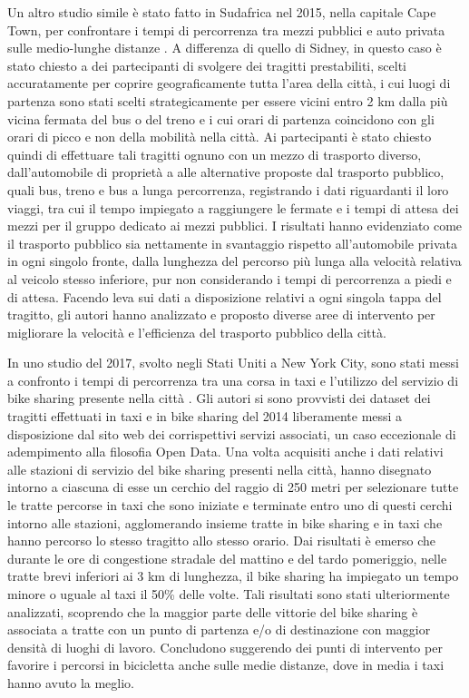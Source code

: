 Un altro studio simile è stato fatto in Sudafrica nel 2015, nella capitale Cape Town, per confrontare i tempi di percorrenza tra mezzi pubblici e auto privata sulle medio-lunghe distanze \cite{hitge2015comparison}. A differenza di quello di Sidney, in questo caso è stato chiesto a dei partecipanti di svolgere dei tragitti prestabiliti, scelti accuratamente per coprire geograficamente tutta l'area della città, i cui luogi di partenza sono stati scelti strategicamente per essere vicini entro 2 km dalla più vicina fermata del bus o del treno e i cui orari di partenza coincidono con gli orari di picco e non della mobilità nella città. Ai partecipanti è stato chiesto quindi di effettuare tali tragitti ognuno con un mezzo di trasporto diverso, dall'automobile di proprietà a alle alternative proposte dal trasporto pubblico, quali bus, treno e bus a lunga percorrenza, registrando i dati riguardanti il loro viaggi, tra cui il tempo impiegato a raggiungere le fermate e i tempi di attesa dei mezzi per il gruppo dedicato ai mezzi pubblici. I risultati hanno evidenziato come il trasporto pubblico sia nettamente in svantaggio rispetto all'automobile privata in ogni singolo fronte, dalla lunghezza del percorso più lunga alla velocità relativa al veicolo stesso inferiore, pur non considerando i tempi di percorrenza a piedi e di attesa. Facendo leva sui dati a disposizione relativi a ogni singola tappa del tragitto, gli autori hanno analizzato e proposto diverse aree di intervento per migliorare la velocità e l'efficienza del trasporto pubblico della città.

In uno studio del 2017, svolto negli Stati Uniti a New York City, sono stati messi a confronto i tempi di percorrenza tra una corsa in taxi e l'utilizzo del servizio di bike sharing presente nella città \cite{faghih2017hail}. Gli autori si sono provvisti dei dataset dei tragitti effettuati in taxi e in bike sharing del 2014 liberamente messi a disposizione dal sito web dei corrispettivi servizi associati, un caso eccezionale di adempimento alla filosofia Open Data. Una volta acquisiti anche i dati relativi alle stazioni di servizio del bike sharing presenti nella città, hanno disegnato intorno a ciascuna di esse un cerchio del raggio di 250 metri per selezionare tutte le tratte percorse in taxi che sono iniziate e terminate entro uno di questi cerchi intorno alle stazioni, agglomerando insieme tratte in bike sharing e in taxi che hanno percorso lo stesso tragitto allo stesso orario. Dai risultati è emerso che durante le ore di congestione stradale del mattino e del tardo pomeriggio, nelle tratte brevi inferiori ai 3 km di lunghezza, il bike sharing ha impiegato un tempo minore o uguale al taxi il 50\% delle volte. Tali risultati sono stati ulteriormente analizzati, scoprendo che la maggior parte delle vittorie del bike sharing è associata a tratte con un punto di partenza e/o di destinazione con maggior densità di luoghi di lavoro. Concludono suggerendo dei punti di intervento per favorire i percorsi in bicicletta anche sulle medie distanze, dove in media i taxi hanno avuto la meglio.


